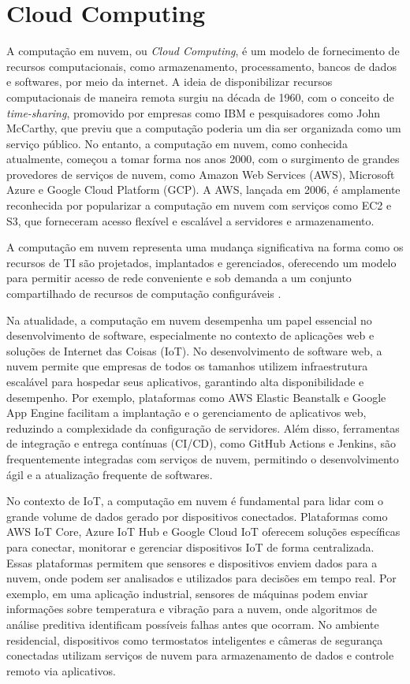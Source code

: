 \section{Cloud Computing}

A computação em nuvem, ou \textit{Cloud Computing}, é um modelo de fornecimento de recursos computacionais, como armazenamento, processamento, bancos de dados e softwares, por meio da internet. A ideia de disponibilizar recursos computacionais de maneira remota surgiu na década de 1960, com o conceito de \textit{time-sharing}, promovido por empresas como IBM e pesquisadores como John McCarthy, que previu que a computação poderia um dia ser organizada como um serviço público. No entanto, a computação em nuvem, como conhecida atualmente, começou a tomar forma nos anos 2000, com o surgimento de grandes provedores de serviços de nuvem, como Amazon Web Services (AWS), Microsoft Azure e Google Cloud Platform (GCP). A AWS, lançada em 2006, é amplamente reconhecida por popularizar a computação em nuvem com serviços como EC2 e S3, que forneceram acesso flexível e escalável a servidores e armazenamento.

\begin{citacao}
	A computação em nuvem representa uma mudança significativa na forma como os recursos de TI são projetados, implantados e gerenciados, oferecendo um modelo para permitir acesso de rede conveniente e sob demanda a um conjunto compartilhado de recursos de computação configuráveis \cite{Erl2013}.
\end{citacao}

Na atualidade, a computação em nuvem desempenha um papel essencial no desenvolvimento de software, especialmente no contexto de aplicações web e soluções de Internet das Coisas (IoT). No desenvolvimento de software web, a nuvem permite que empresas de todos os tamanhos utilizem infraestrutura escalável para hospedar seus aplicativos, garantindo alta disponibilidade e desempenho. Por exemplo, plataformas como AWS Elastic Beanstalk e Google App Engine facilitam a implantação e o gerenciamento de aplicativos web, reduzindo a complexidade da configuração de servidores. Além disso, ferramentas de integração e entrega contínuas (CI/CD), como GitHub Actions e Jenkins, são frequentemente integradas com serviços de nuvem, permitindo o desenvolvimento ágil e a atualização frequente de softwares.

No contexto de IoT, a computação em nuvem é fundamental para lidar com o grande volume de dados gerado por dispositivos conectados. Plataformas como AWS IoT Core, Azure IoT Hub e Google Cloud IoT oferecem soluções específicas para conectar, monitorar e gerenciar dispositivos IoT de forma centralizada. Essas plataformas permitem que sensores e dispositivos enviem dados para a nuvem, onde podem ser analisados e utilizados para decisões em tempo real. Por exemplo, em uma aplicação industrial, sensores de máquinas podem enviar informações sobre temperatura e vibração para a nuvem, onde algoritmos de análise preditiva identificam possíveis falhas antes que ocorram. No ambiente residencial, dispositivos como termostatos inteligentes e câmeras de segurança conectadas utilizam serviços de nuvem para armazenamento de dados e controle remoto via aplicativos.

